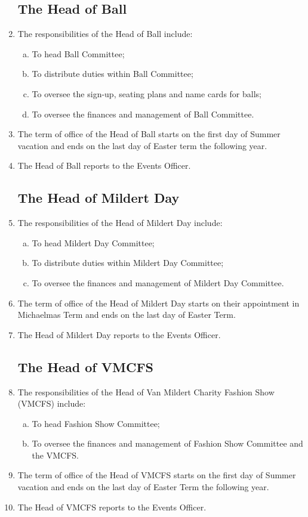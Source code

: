 \documentclass[12pt]{article}
\begin{document}
\begin{enumerate}
    \subsection{The Head of Ball}
    \item The responsibilities of the Head of Ball include:
    \begin{enumerate}[(a)]
        \item To head Ball Committee;
        \item To distribute duties within Ball Committee;
        \item To oversee the sign-up, seating plans and name cards for balls;
        \item To oversee the finances and management of Ball Committee.
    \end{enumerate}
    \item The term of office of the Head of Ball starts on the first day of Summer vacation and ends on the last day of Easter term the following year.
    \item The Head of Ball reports to the Events Officer.
    \subsection{The Head of Mildert Day}
    \item The responsibilities of the Head of Mildert Day include:
    \begin{enumerate}[(a)]
        \item To head Mildert Day Committee;
        \item To distribute duties within Mildert Day Committee;
        \item To oversee the finances and management of Mildert Day Committee.
    \end{enumerate}
    \item The term of office of the Head of Mildert Day starts on their appointment in Michaelmas Term and ends on the last day of Easter Term.
    \item The Head of Mildert Day reports to the Events Officer.
    \subsection{The Head of VMCFS}
    \item The responsibilities of the Head of Van Mildert Charity Fashion Show (VMCFS) include:
    \begin{enumerate}[(a)]
        \item To head Fashion Show Committee;
        \item To oversee the finances and management of Fashion Show Committee and the VMCFS.
    \end{enumerate}
    \item The term of office of the Head of VMCFS starts on the first day of Summer vacation and ends on the last day of Easter Term the following year.
    \item The Head of VMCFS reports to the Events Officer.


\end{enumerate}
\end{document}
